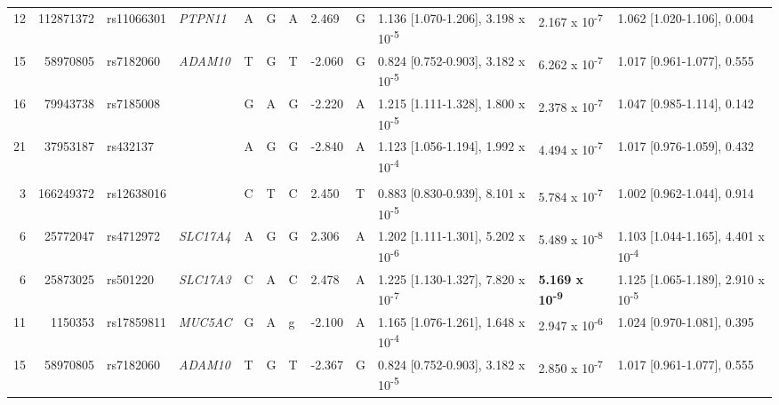 \documentclass[]{report}
\begin{document}
\begin{landscape}
\begin{table}
{\begin{tabular}[t]{rrllllllllll}
\hspace{1em}12 & 112871372 & rs11066301 & \em{PTPN11} & A & G & A & 2.469 & G & 1.136 [1.070-1.206], 3.198 x 10\textsuperscript{-5} & 2.167 x 10\textsuperscript{-7} & 1.062 [1.020-1.106], 0.004\\
\hspace{1em}15 & 58970805 & rs7182060 & \em{ADAM10} & T & G & T & -2.060 & G & 0.824 [0.752-0.903], 3.182 x 10\textsuperscript{-5} & 6.262 x 10\textsuperscript{-7} & 1.017 [0.961-1.077], 0.555\\
\hspace{1em}16 & 79943738 & rs7185008 & \em{} & G & A & G & -2.220 & A & 1.215 [1.111-1.328], 1.800 x 10\textsuperscript{-5} & 2.378 x 10\textsuperscript{-7} & 1.047 [0.985-1.114], 0.142\\
\hspace{1em}21 & 37953187 & rs432137 & \em{} & A & G & G & -2.840 & A & 1.123 [1.056-1.194], 1.992 x 10\textsuperscript{-4} & 4.494 x 10\textsuperscript{-7} & 1.017 [0.976-1.059], 0.432\\
\addlinespace[0.3em]
\multicolumn{12}{l}{\textbf{nSL}}\\
\hspace{1em}3 & 166249372 & rs12638016 & \em{} & C & T & C & 2.450 & T & 0.883 [0.830-0.939], 8.101 x 10\textsuperscript{-5} & 5.784 x 10\textsuperscript{-7} & 1.002 [0.962-1.044], 0.914\\
\hspace{1em}6 & 25772047 & rs4712972 & \em{SLC17A4} & A & G & G & 2.306 & A & 1.202 [1.111-1.301], 5.202 x 10\textsuperscript{-6} & 5.489 x 10\textsuperscript{-8} & 1.103 [1.044-1.165], 4.401 x 10\textsuperscript{-4}\\
\hspace{1em}6 & 25873025 & rs501220 & \em{SLC17A3} & C & A & C & 2.478 & A & 1.225 [1.130-1.327], 7.820 x 10\textsuperscript{-7} & \textbf{5.169 x 10\textsuperscript{-9}} & 1.125 [1.065-1.189], 2.910 x 10\textsuperscript{-5}\\
\hspace{1em}11 & 1150353 & rs17859811 & \em{MUC5AC} & G & A & g & -2.100 & A & 1.165 [1.076-1.261], 1.648 x 10\textsuperscript{-4} & 2.947 x 10\textsuperscript{-6} & 1.024 [0.970-1.081], 0.395\\
\hspace{1em}15 & 58970805 & rs7182060 & \em{ADAM10} & T & G & T & -2.367 & G & 0.824 [0.752-0.903], 3.182 x 10\textsuperscript{-5} & 2.850 x 10\textsuperscript{-7} & 1.017 [0.961-1.077], 0.555\\

\end{tabular}}
\end{table}
\end{landscape}
\end{document}

